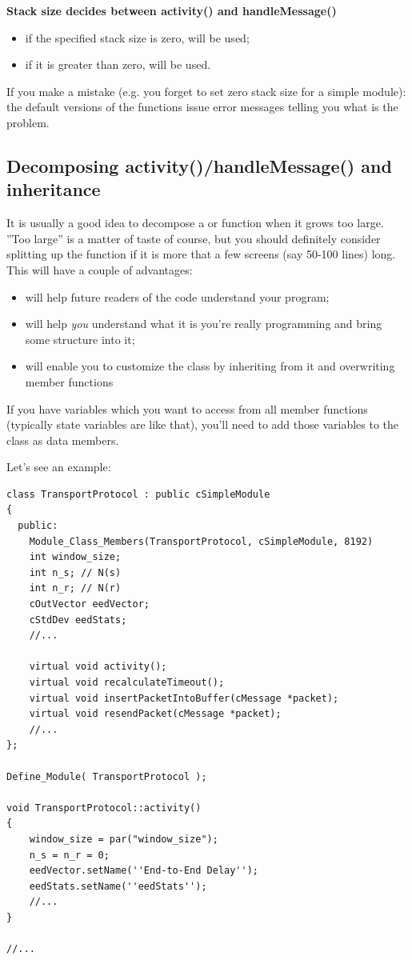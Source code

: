 \textbf{Stack size decides between activity() and handleMessage()}

\begin{itemize}
\item{if the specified stack size is zero,  will be used;}
\item{if it is greater than zero,  will be used.}
\end{itemize}

If you make a mistake (e.g. you forget to set zero stack size
 for a 
simple module): the default versions of the
functions issue error messages telling you what is the problem.





\subsection{Decomposing activity()/handleMessage() and inheritance}

It is usually a good idea to decompose a  or
 function when it grows too large. ''Too
large'' is a matter of taste of course, but you should definitely
consider splitting up the function if it is more that a few screens
(say 50-100 lines) long. This will have a couple of advantages:
\begin{itemize}
\item{will help future readers of the code understand your program;}
\item{will help \textit{you} understand what it is you're really programming 
and bring some structure into it;}
\item{will enable you to customize the class by inheriting from it and
    overwriting member functions}
\end{itemize}

If you have variables which you want to access from all member
functions (typically state variables are like that), you'll need to
add those variables to the class as data members.

Let's see an example:

\begin{Verbatim}
class TransportProtocol : public cSimpleModule
{
  public:
    Module_Class_Members(TransportProtocol, cSimpleModule, 8192)
    int window_size;
    int n_s; // N(s)
    int n_r; // N(r)
    cOutVector eedVector;
    cStdDev eedStats;
    //...

    virtual void activity();
    virtual void recalculateTimeout();
    virtual void insertPacketIntoBuffer(cMessage *packet);
    virtual void resendPacket(cMessage *packet);
    //...
};

Define_Module( TransportProtocol );

void TransportProtocol::activity()
{
    window_size = par("window_size");
    n_s = n_r = 0;
    eedVector.setName(''End-to-End Delay'');
    eedStats.setName(''eedStats'');
    //...
}

//...
\end{Verbatim}

